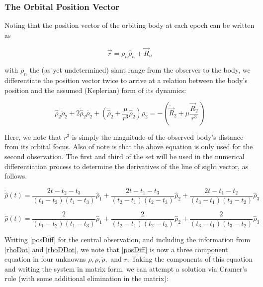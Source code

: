 \documentclass[11pt,twoside,letterpaper]{article}
\begin{document}
  \subsubsection{The Orbital Position Vector}
  Noting that the position vector of the orbiting body at each epoch
  can be written as

  \begin{equation} \label{focalPos}
    \vec{r} = \rho_n\hat{\rho}_n + \vec{R}_n
  \end{equation}

  with $\rho_n$ the (as yet undetermined) slant range from the observer
  to the body, we differentiate the position vector twice to arrive at
  a relation between the body's position and the assumed
  (Keplerian) form of its dynamics:

  \begin{equation} \label{posDiff}
    \hat{\rho}_2\ddot{\rho}_2 + 2\dot{\hat{\rho}}_2\dot{\rho_2}
    + \left( \ddot{\hat{\rho}}_2 + \frac{\mu}{r^3}\hat{\rho}_2 \right)\rho_2
    = -\left( \ddot{\vec{R}}_2 + \mu\frac{\vec{R}_2}{r^3} \right)
  \end{equation}

  Here, we note that $r^3$ is simply the magnitude of the observed
  body's distance from its orbital focus. Also of note is that the
  above equation is only used for the second observation. The first
  and third of the set will be used in the numerical differentiation
  process to determine the derivatives of the line of sight vector, as
  follows.

  \begin{equation} \label{rhoDot}
    \dot{\hat{\rho}}(t) =
    \frac{2t - t_2 - t_3}{(t_1 - t_2)(t_1 - t_3)}\hat{\rho}_1
      + \frac{2t - t_1 - t_3}{(t_2 - t_1)(t_2 - t_3)}\hat{\rho}_2
      + \frac{2t - t_1 - t_2}{(t_3 - t_1)(t_3 - t_2)}\hat{\rho}_3
  \end{equation}

  \begin{equation} \label{rhoDDot}
    \ddot{\hat{\rho}}(t) =
    \frac{2}{(t_1 - t_2)(t_1 - t_3)}\hat{\rho}_1
      + \frac{2}{(t_2 - t_1)(t_2 - t_3)}\hat{\rho}_2
      + \frac{2}{(t_3 - t_1)(t_3 - t_2)}\hat{\rho}_3
  \end{equation}

  Writing \ref{posDiff} for the central observation, and including the
  information from \ref{rhoDot} and \ref{rhoDDot}, we note that
  \ref{posDiff} is now a three component equation in four unknowns
  $\rho, \dot{\rho}, \ddot{\rho},$ and $r$. Taking the components of
  this equation and writing the system in matrix form, we can attempt
  a solution via Cramer's rule (with some additional elimination in
  the matrix):
\end{document}
